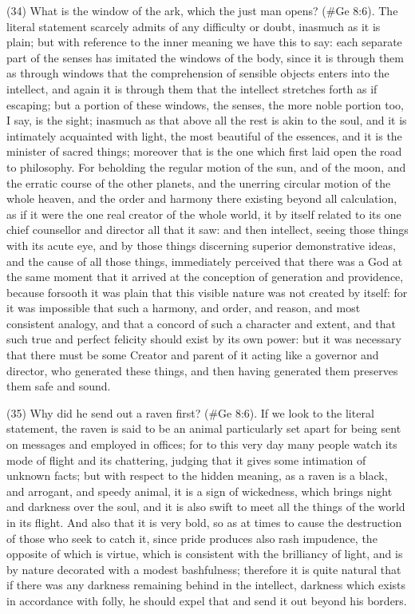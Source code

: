 (34) What is the window of the ark, which the just man opens? (\#Ge 8:6). The literal statement
scarcely admits of any difficulty or doubt, inasmuch as it is plain; but with reference to the inner
meaning we have this to say: each separate part of the senses has imitated the windows of the
body, since it is through them as through windows that the comprehension of sensible objects
enters into the intellect, and again it is through them that the intellect stretches forth as if escaping;
but a portion of these windows, the senses, the more noble portion too, I say, is the sight;
inasmuch as that above all the rest is akin to the soul, and it is intimately acquainted with light, the
most beautiful of the essences, and it is the minister of sacred things; moreover that is the one
which first laid open the road to philosophy. For beholding the regular motion of the sun, and of the
moon, and the erratic course of the other planets, and the unerring circular motion of the whole
heaven, and the order and harmony there existing beyond all calculation, as if it were the one real
creator of the whole world, it by itself related to its one chief counsellor and director all that it saw:
and then intellect, seeing those things with its acute eye, and by those things discerning superior
demonstrative ideas, and the cause of all those things, immediately perceived that there was a
God at the same moment that it arrived at the conception of generation and providence, because
forsooth it was plain that this visible nature was not created by itself: for it was impossible that such
a harmony, and order, and reason, and most consistent analogy, and that a concord of such a
character and extent, and that such true and perfect felicity should exist by its own power: but it
was necessary that there must be some Creator and parent of it acting like a governor and
director, who generated these things, and then having generated them preserves them safe and
sound.

(35) Why did he send out a raven first? (\#Ge 8:6). If we look to the literal statement, the raven
is said to be an animal particularly set apart for being sent on messages and employed in offices;
for to this very day many people watch its mode of flight and its chattering, judging that it gives
some intimation of unknown facts; but with respect to the hidden meaning, as a raven is a black,
and arrogant, and speedy animal, it is a sign of wickedness, which brings night and darkness over
the soul, and it is also swift to meet all the things of the world in its flight. And also that it is very
bold, so as at times to cause the destruction of those who seek to catch it, since pride produces
also rash impudence, the opposite of which is virtue, which is consistent with the brilliancy of light,
and is by nature decorated with a modest bashfulness; therefore it is quite natural that if there was
any darkness remaining behind in the intellect, darkness which exists in accordance with folly, he
should expel that and send it out beyond his borders.

